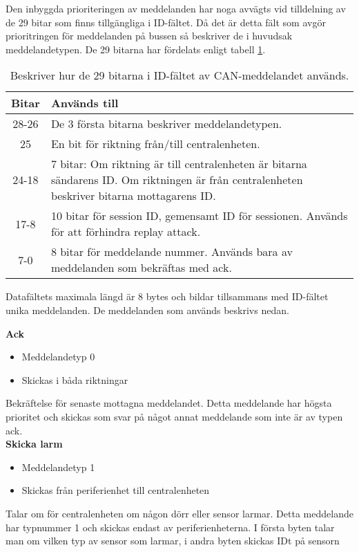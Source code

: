 Den inbyggda prioriteringen av meddelanden har noga avvägts vid tilldelning av de 29 bitar som finns tillgängliga i ID-fältet.
Då det är detta fält som avgör prioritringen för meddelanden på bussen så beskriver de i huvudsak meddelandetypen.
De 29 bitarna har fördelats enligt tabell \ref{tab:idbitar}.

\begin{table}[H]
	\centering
	\begin{tabular}{|c|p{}|}
		\hline
		Bitar 	& Används till \\ \hline \hline
		28-26		& De 3 första bitarna beskriver meddelandetypen. \\ \hline
		25		& En bit för riktning från/till centralenheten. \\ \hline
		24-18	& 7 bitar:
		Om riktning är till centralenheten är bitarna sändarens ID.
		Om riktningen är från centralenheten beskriver bitarna mottagarens ID. \\ \hline
		17-8 & 10 bitar för session ID, gemensamt ID för sessionen. Används för att förhindra replay attack. \\ \hline
		7-0 & 8 bitar för meddelande nummer. Används bara av meddelanden som bekräftas med ack. \\ \hline

	\end{tabular}
	\caption{Beskriver hur de 29 bitarna i ID-fältet av CAN-meddelandet används.}
	\label{tab:idbitar}
\end{table}


Datafältets maximala längd är 8 bytes och bildar tillsammans med ID-fältet unika meddelanden. De meddelanden som används beskrivs nedan.



\textbf{Ack}
\begin{itemize}
    \item Meddelandetyp 0
    \item Skickas i båda riktningar
\end{itemize}
Bekräftelse för senaste mottagna meddelandet. Detta meddelande har högsta prioritet och skickas som svar på något annat meddelande som inte är av typen ack. \\


\textbf{Skicka larm}
\begin{itemize}
    \item Meddelandetyp 1
    \item Skickas från periferienhet till centralenheten
\end{itemize}
Talar om för centralenheten om någon dörr eller sensor larmar. Detta meddelande har typnummer 1 och skickas endast av periferienheterna. I första byten talar man om vilken typ av sensor som larmar, i andra byten skickas IDt på sensorn\\


